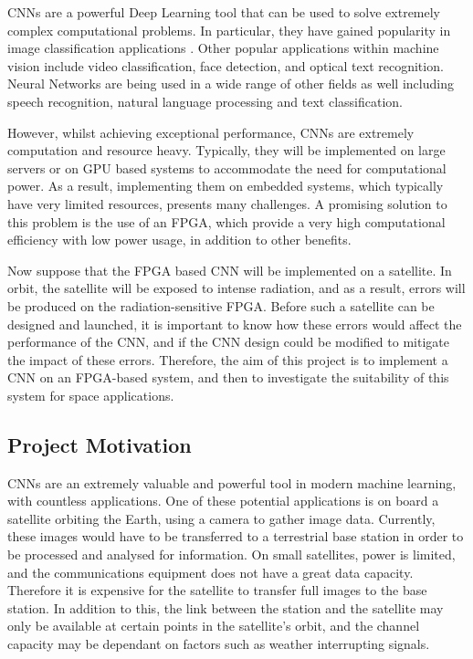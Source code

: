\documentclass[12pt]{article}
\begin{document}
CNNs are a powerful Deep Learning tool that can be used to solve extremely complex computational problems. In particular, they have gained popularity in image classification applications \cite{ImageNetChallenge}. Other popular applications within machine vision include video classification, face detection, and optical text recognition. Neural Networks are being used in a wide range of other fields as well including speech recognition, natural language processing and text classification\cite{SudaFpgaAccelerator}.

However, whilst achieving exceptional performance, CNNs are extremely computation and resource heavy. Typically, they will be implemented on large servers or on GPU based systems to accommodate the need for computational power. As a result, implementing them on embedded systems, which typically have very limited resources, presents many challenges. A promising solution to this problem is the use of an FPGA, which provide a very high computational efficiency with low power usage, in addition to other benefits.

Now suppose that the FPGA based CNN will be implemented on a satellite. In orbit, the satellite will be exposed to intense radiation, and as a result, errors will be produced on the radiation-sensitive FPGA. Before such a satellite can be designed and launched, it is important to know how these errors would affect the performance of the CNN, and if the CNN design could be modified to mitigate the impact of these errors. Therefore, the aim of this project is to implement a CNN on an FPGA-based system, and then to investigate the suitability of this system for space applications.

\subsection{Project Motivation}
\label{sec:Intro-ProjectMotivation}

CNNs are an extremely valuable and powerful tool in modern machine learning, with countless applications. One of these potential applications is on board a satellite orbiting the Earth, using a camera to gather image data. Currently, these images would have to be transferred to a terrestrial base station in order to be processed and analysed for information. On small satellites, power is limited, and the communications equipment does not have a great data capacity. Therefore it is expensive for the satellite to transfer full images to the base station. In addition to this, the link between the station and the satellite may only be available at certain points in the satellite’s orbit, and the channel capacity may be dependant on factors such as weather interrupting signals. 
\end{document}
